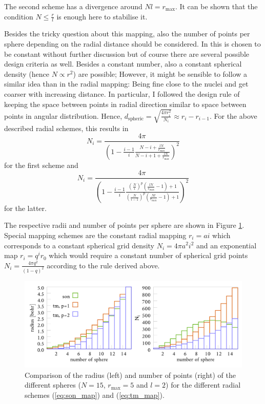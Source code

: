 The second scheme has a divergence around $Nl=r_\text{max}$. 
It can be shown that the condition $N\leq \frac rl $ is enough here to stabilise it.

Besides the tricky question about this mapping, also the number of points per sphere depending on the radial distance should be considered. 
In \cite{Son_Chu0} this is chosen to be constant without further discussion but of course there are several possible design criteria as well.
Besides a constant number, also a constant spherical density (hence $N\propto r^2$) are possible; However, it might be sensible to follow a similar idea than in the radial mapping: Being fine close to the nuclei and get coarser with increasing distance.
In particular, I followed the design rule of keeping the space between points in radial direction similar to space between points in angular distribution.
Hence, $d_\text{spheric}=\sqrt{\frac{4\pi r_i^2}{N_i}}\approx r_i-r_{i-1}$.
For the above described radial schemes, this results in 
\begin{equation}\label{eq:tm_num}
N_i= \frac{4\pi}{ \left(1-\frac{i-1 }{i}\frac{N-i+\frac{lN}{r_\text{max}}}{N-i+1+\frac{lN}{r_\text{max}}}\right)^2 }
\end{equation}
for the first scheme and 
\begin{equation} \label{eq:son_num}
N_i= \frac{4\pi}{\left(1-\frac{i-1 }{i}\frac{ (\frac{N}{i})^p \left(\frac{lN}{r_\text{max}}-1\right)+1}{ (\frac{N}{i-1})^p\left( \frac{Nl}{r_\text{max}} -1 \right) +1 } \right)^2 }
\end{equation}
for the latter.

The respective radii and number of points per sphere are shown in Figure \ref{fig:maps}.\\
Special mapping schemes are the constant radial mapping $r_i=a i$ which corresponds to a constant spherical grid density $N_i=4\pi a^2 i^2$ and an exponential map $r_i=q^i r_0$ which would require a constant number of spherical grid points $N_i=\frac{4\pi q^2}{(1-q)^2}$ according to the rule derived above.

\begin{figure}
\includegraphics[width=\textwidth]{Data/radial_mapping}
\caption{Comparison of the radius (left) and number of points (right) of the different spheres ($N=15$, $r_\text{max}=5$ and $l=2$) for the different radial schemes (\ref{eq:son_map}) and (\ref{eq:tm_map}).}
\label{fig:maps}
\end{figure}

